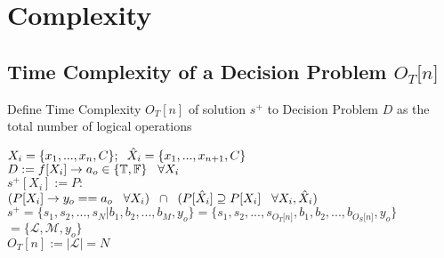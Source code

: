\documentclass[11pt]{article}
\begin{document}
\section{Complexity}

\subsection{Time Complexity of a Decision Problem $O_T \lbrack n \rbrack$}
Define Time Complexity $O_T [n]$ of solution $s^+$ to Decision Problem $D$ as the total number of logical operations
\begin{center}
\vspace{1mm}
$
X_i = \{x_1,...,x_n,C\}; \hspace{2mm} \hat{X}_i = \{x_1,...,x_{n+1},C\}
$
\\ \vspace{4mm}
$
D := f \lbrack X_i \rbrack \rightarrow a_{o} \in \{\mathbb{T}, \mathbb{F}\} \hspace{3mm} \forall X_i
$
\\ \vspace{4mm}
$
s^+[X_i] := P :
$
\\ \vspace{2mm}
$
(P \lbrack X_i \rbrack \rightarrow y_{o} == a_{o} \hspace{3mm} \forall X_i) \hspace{2mm} \cap \hspace{2mm} (P[\hat{X}_i] \supseteq P[X_i] \hspace{3mm} \forall X_i,\hat{X}_i)
$
\\ \vspace{4mm}
$
s^+ = \{ s_1,s_2,...,s_N|b_1,b_2,...,b_M,y_o\} = \{ s_1,s_2,...,s_{O_T \lbrack n \rbrack }, b_1, b_2,...,b_{O_S \lbrack n \rbrack},y_o \}
$
\\ \vspace{2mm}
$
= \{ \mathcal{L},\mathcal{M},y_o\}
$
\\ \vspace{3mm}
$
O_T[n] := |\mathcal{L}| = N
$
\end{center}
\end{document}
